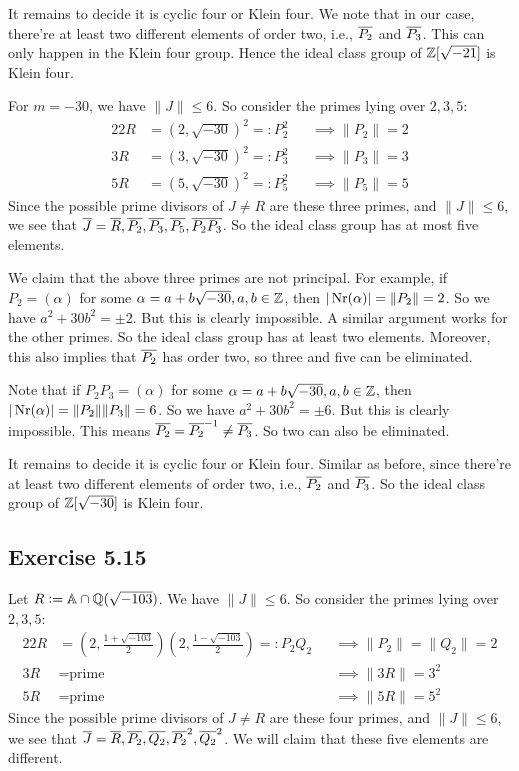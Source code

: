 \documentclass[../Marcus.tex]{subfiles}
\begin{document}
It remains to decide it is cyclic four or Klein four. We note that in our case, there're at least two different elements of order two, i.e., $\overline{P_2}$ and $\overline{P_3}$. This can only happen in the Klein four group. Hence the ideal class group of $\mathbb{Z}[\sqrt{-21}]$ is Klein four.

For $m=-30$, we have $\|J\| \leq 6$. So consider the primes lying over $2,3,5$:
\begin{alignat*}{2}
2R &= (2,\sqrt{-30})^2 =: P_2^2  &&\implies \|P_2\| = 2   \\
3R &= (3,\sqrt{-30})^2 =: P_3^2  &&\implies \|P_3\| = 3   \\
5R &= (5,\sqrt{-30})^2 =: P_5^2  &&\implies \|P_5\| = 5
\end{alignat*}
Since the possible prime divisors of $J\neq R$ are these three primes, and $\|J\| \leq 6$, we see that $\overline{J}=\overline{R},\overline{P_2},\overline{P_3},\overline{P_5},\overline{P_2P_3}$. So the ideal class group has at most five elements.

We claim that the above three primes are not principal. For example, if $P_2 = (\alpha)$ for some $\alpha=a+b\sqrt{-30},a,b\in \mathbb{Z}$, then $|\operatorname{Nr}(\alpha)| = \|P_2\| = 2$. So we have $a^2+30b^2 = \pm2$. But this is clearly impossible. A similar argument works for the other primes. So the ideal class group has at least two elements. Moreover, this also implies that $\overline{P_2}$ has order two, so three and five can be eliminated.

Note that if $P_2P_3 = (\alpha)$ for some $\alpha=a+b\sqrt{-30},a,b\in \mathbb{Z}$, then $|\operatorname{Nr}(\alpha)| = \|P_2\|\|P_3\| = 6$. So we have $a^2+30b^2 = \pm6$. But this is clearly impossible. This means $\overline{P_2} = \overline{P_2}^{-1} \neq \overline{P_3}$. So two can also be eliminated.

It remains to decide it is cyclic four or Klein four. Similar as before, since there're at least two different elements of order two, i.e., $\overline{P_2}$ and $\overline{P_3}$. So the ideal class group of $\mathbb{Z}[\sqrt{-30}]$ is Klein four.

\subsection*{Exercise 5.15}

Let $R:=\mathbb{A}\cap\mathbb{Q}(\sqrt{-103})$. We have $\|J\| \leq 6$. So consider the primes lying over $2,3,5$:
\begin{alignat*}{2}
2R &= \left(2,\frac{1+\sqrt{-103}}{2}\right) \left(2,\frac{1-\sqrt{-103}}{2}\right)  =: P_2Q_2    &&\implies \|P_2\| = \|Q_2\| = 2  \\
3R &= \text{prime}      &&\implies \|3R\| = 3^2 \\
5R &= \text{prime}      &&\implies \|5R\| = 5^2
\end{alignat*}
Since the possible prime divisors of $J\neq R$ are these four primes, and $\|J\| \leq 6$, we see that $\overline{J}=\overline{R},\overline{P_2},\overline{Q_2},\overline{P_2}^2,\overline{Q_2}^2$. We will claim that these five elements are different.
\end{document}
